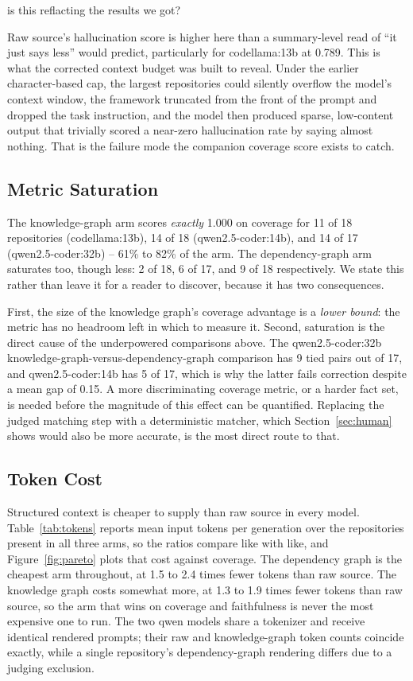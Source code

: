 is this reflacting the results we got?\documentclass[conference]{IEEEtran}
\begin{document}
Raw source's hallucination score is higher here than a summary-level read of ``it just says
less'' would predict, particularly for codellama:13b at 0.789. This is what the corrected
context budget was built to reveal. Under the earlier character-based cap, the largest
repositories could silently overflow the model's context window, the framework truncated from
the front of the prompt and dropped the task instruction, and the model then produced sparse,
low-content output that trivially scored a near-zero hallucination rate by saying almost
nothing. That is the failure mode the companion coverage score exists to catch.

\subsection{Metric Saturation}
\label{sec:ceiling}
The knowledge-graph arm scores \emph{exactly} 1.000 on coverage for 11 of 18 repositories
(codellama:13b), 14 of 18 (qwen2.5-coder:14b), and 14 of 17 (qwen2.5-coder:32b) -- 61\% to 82\%
of the arm. The dependency-graph arm saturates too, though less: 2 of 18, 6 of 17, and 9 of 18
respectively. We state this rather than leave it for a reader to discover, because it has two
consequences.

First, the size of the knowledge graph's coverage advantage is a \emph{lower bound}: the metric
has no headroom left in which to measure it. Second, saturation is the direct cause of the
underpowered comparisons above. The qwen2.5-coder:32b knowledge-graph-versus-dependency-graph
comparison has 9 tied pairs out of 17, and qwen2.5-coder:14b has 5 of 17, which is why the
latter fails correction despite a mean gap of 0.15. A more discriminating coverage metric, or a
harder fact set, is needed before the magnitude of this effect can be quantified. Replacing the
judged matching step with a deterministic matcher, which Section~\ref{sec:human} shows would
also be more accurate, is the most direct route to that.

\subsection{Token Cost}
Structured context is cheaper to supply than raw source in every model.
Table~\ref{tab:tokens} reports mean input tokens per generation over the repositories present in
all three arms, so the ratios compare like with like, and Figure~\ref{fig:pareto} plots that
cost against coverage. The dependency graph is the cheapest arm throughout, at 1.5 to 2.4 times
fewer tokens than raw source. The knowledge graph costs somewhat more, at 1.3 to 1.9 times fewer
tokens than raw source, so the arm that wins on coverage and faithfulness is never the most
expensive one to run. The two qwen models share a tokenizer and receive identical rendered
prompts; their raw and knowledge-graph token counts coincide exactly, while a single
repository's dependency-graph rendering differs due to a judging exclusion.
\end{document}
